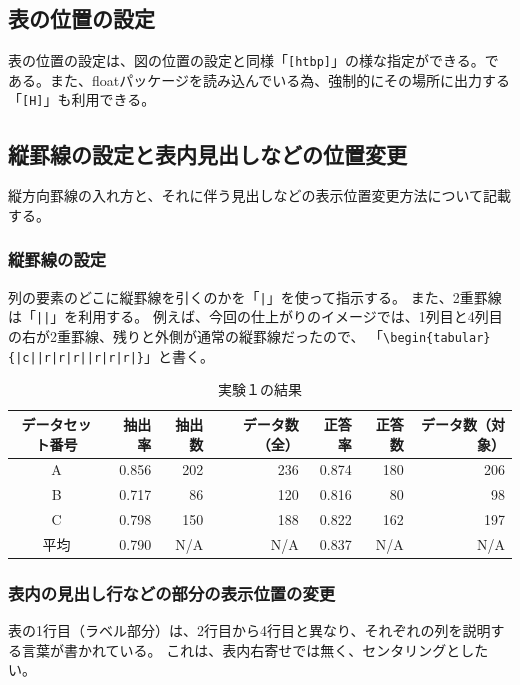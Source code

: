 \subsection{表の位置の設定}
表の位置の設定は、図の位置の設定と同様「\verb+[htbp]+」の様な指定ができる。である。また、floatパッケージを読み込んでいる為、強制的にその場所に出力する「\verb+[H]+」も利用できる。

\subsection{縦罫線の設定と表内見出しなどの位置変更}
縦方向罫線の入れ方と、それに伴う見出しなどの表示位置変更方法について記載する。

\subsubsection{縦罫線の設定}
列の要素のどこに縦罫線を引くのかを「\verb+|+」を使って指示する。
また、2重罫線は「\verb+||+」を利用する。
例えば、今回の仕上がりのイメージでは、1列目と4列目の右が2重罫線、残りと外側が通常の縦罫線だったので、
「\verb+\begin{tabular}{|c||r|r|r||r|r|r|}+」と書く。
\begin{table}[H]
\caption{実験１の結果}
\centering
\begin{tabular}{|c||r|r|r||r|r|r|}
\hline
データセット番号 & 抽出率 & 抽出数 & データ数（全） & 正答率 & 正答数 & データ数（対象）\\ \hline \hline
A & 0.856 & 202 & 236 & 0.874 & 180 & 206\\ \hline
B & 0.717 & 86 & 120 & 0.816 & 80 & 98\\ \hline
C & 0.798 & 150 & 188 & 0.822 & 162 & 197\\ \hline \hline
平均 & 0.790 & N/A & N/A & 0.837 & N/A & N/A\\ \hline
\end{tabular}
\label{table:resultEx1d}
\end{table}

\subsubsection{表内の見出し行などの部分の表示位置の変更}
表の1行目（ラベル部分）は、2行目から4行目と異なり、それぞれの列を説明する言葉が書かれている。
これは、表内右寄せでは無く、センタリングとしたい。

